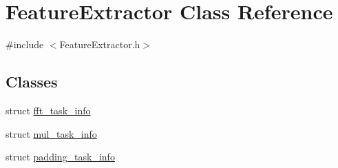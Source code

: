 \hypertarget{class_feature_extractor}{\section{Feature\+Extractor Class Reference}
\label{class_feature_extractor}
}


{\ttfamily \#include $<$Feature\+Extractor.\+h$>$}

\subsection*{Classes}
\begin{DoxyCompactItemize}
\item 
struct \hyperlink{struct_feature_extractor_1_1fft__task__info}{fft\+\_\+task\+\_\+info}
\item 
struct \hyperlink{struct_feature_extractor_1_1mul__task__info}{mul\+\_\+task\+\_\+info}
\item 
struct \hyperlink{struct_feature_extractor_1_1padding__task__info}{padding\+\_\+task\+\_\+info}
\end{DoxyCompactItemize}
